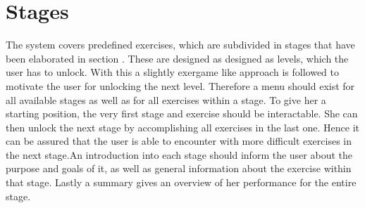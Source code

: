 \section{Stages}\label{4_3_stages}
The system covers predefined exercises, which are subdivided in stages that have been elaborated in section \textit{}. These are designed as designed as levels, which the user has to unlock. With this a slightly exergame like approach is followed to motivate the user for unlocking the next level. Therefore a menu should exist for all available stages as well as for all exercises within a stage. To give her a starting position, the very first stage and exercise should be interactable. She can then unlock the next stage by accomplishing all exercises in the last one. Hence it can be assured that the user is able to encounter with more difficult exercises in the next stage.An introduction into each stage should inform the user about the purpose and goals of it, as well as general information about the exercise within that stage. Lastly a summary gives an overview of her performance for the entire stage.


